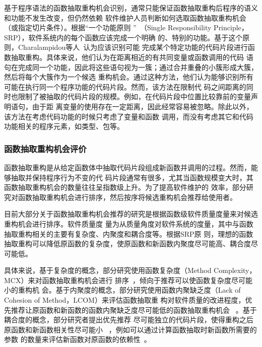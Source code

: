 基于程序语法的函数抽取重构机会识别，通常只能保证函数抽取重构后程序的语义和功能不发生改变，但仍然依赖
软件维护人员判断如何选取函数抽取重构机会（或指定切片条件）。根据``一个功能原则
''~\cite{martin2003agile}（Single Responsibility Principle，SRP），软件系统内的每个函数应该完成一个明确
的、特别的功能。基于这个原则，Charalampidou等人~\cite{charalampidou2016identifying}认为应该识别可能
完成某个特定功能的代码片段进行函数抽取重构。具体来说，他们认为在距离相近的有共同变量或函数调用的代码
语句在完成同一个功能，因此将这些语句视为一簇；通过合并重叠的小簇形成大簇，然后将每个大簇作为一个候选
重构机会。通过这种方法，他们认为能够识别所有可能在执行同一个程序功能的代码片段。然而，该方法在限制代
码之间距离的同时也限制了被抽取的代码片段的规模。例如，在代码片段中位置比较靠前的变量声明语句，由于距
离变量的使用存在一定距离，因此经常容易被忽略。除此以外，该方法在考虑代码功能的时候只考虑了变量和函数
调用，而没有考虑其它和代码功能相关的程序元素，如类型、包等。

\subsubsection{函数抽取重构机会评价}

函数抽取重构是从给定函数体中抽取代码片段组成新函数并调用的过程。然而，能够抽取并保持程序行为不变的代
码片段通常有很多，尤其当函数规模变大时，其函数抽取重构机会的数量往往呈指数级上升。为了提高软件维护的
效率，部分研究对函数抽取重构机会进行排序，然后按序将候选重构机会推荐给使用者。

目前大部分关于函数抽取重构机会推荐的研究是根据函数级软件质量度量来对候选重构机会进行排序。软件质量度
量为从质量角度对软件系统的度量，其中与函数抽取重构相关的主要有复杂度、内聚度和耦合度等。根据SRP原
则，理想的函数抽取重构可以降低原函数的复杂度，使原函数和新函数内聚度尽可能高、耦合度尽可能低。

具体来说，基于复杂度的概念，部分研究使用函数复杂度（Method Complexity，MCX）来对函数抽取重构机会进行
排序~\cite{meananeatra2011using, yang2009identifying}，倾向于推荐可以使函数复杂度尽可能小的重构机
会。基于内聚度的概念，部分研究使用函数内聚缺乏度（Lack of Cohesion of Method，LCOM）来评估函数抽取重
构对软件质量的改进程度，优先推荐让原函数和新函数的函数内聚缺乏度尽可能低的函数抽取重构机会
~\cite{meananeatra2011using, charalampidou2016identifying}。基于耦合度的概念，部分研究者提出优先推荐
尽可能独立的代码片段，使得重构之后原函数和新函数相关性尽可能小
~\cite{yang2009identifying,silva:ICPC14,silva:CoRR15}，例如可以通过计算函数抽取时新函数所需要的参数
的数量来评估新函数对原函数的依赖性~\cite{yang2009identifying}。

